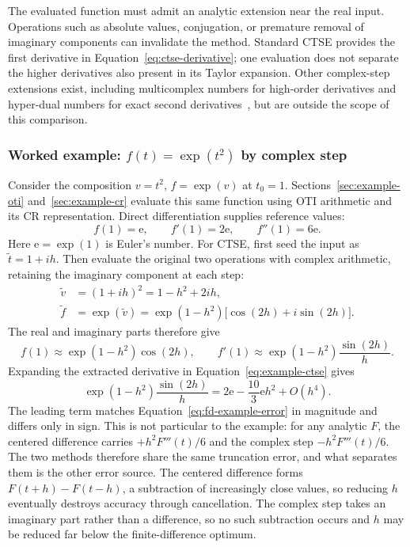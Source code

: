 \documentclass[10pt]{article}
\begin{document}
The evaluated function must admit an analytic extension near the real input.
Operations such as absolute values, conjugation, or premature removal of
imaginary components can invalidate the method. Standard CTSE provides the
first derivative in Equation~\eqref{eq:ctse-derivative}; one evaluation does not
separate the higher derivatives also present in its Taylor expansion. Other
complex-step extensions exist, including multicomplex numbers for high-order
derivatives and hyper-dual numbers for exact second
derivatives~\cite{multi_complex,multi-dual}, but are outside the scope of this
comparison.
\subsubsection{Worked example: \texorpdfstring{$f(t)=\exp(t^2)$}{f(t) = exp(t squared)} by complex step}
\label{sec:example-ctse}
Consider the composition $v=t^2$, $f=\exp(v)$ at $t_0=1$.
Sections~\ref{sec:example-oti} and~\ref{sec:example-cr} evaluate this same function
using OTI arithmetic and its CR representation. Direct differentiation supplies
reference values:
\begin{equation}
\label{eq:example-reference}
 f(1)=\mathrm e,\qquad f'(1)=2\mathrm e,\qquad f''(1)=6\mathrm e.
\end{equation}
Here $\mathrm e=\exp(1)$ is Euler's number. For CTSE, first seed the input as
$\widetilde t=1+ih$. Then evaluate the original two operations with complex
arithmetic, retaining the imaginary component at each step:
\begin{align*}
 \widetilde v&=(1+ih)^2=1-h^2+2ih,\\
 \widetilde f&=\exp(\widetilde v)
 =\exp(1-h^2)\bigl[\cos(2h)+i\sin(2h)\bigr].
\end{align*}
The real and imaginary parts therefore give
\begin{equation}
\label{eq:example-ctse}
 f(1)\approx\exp(1-h^2)\cos(2h),\qquad
 f'(1)\approx\exp(1-h^2)\frac{\sin(2h)}{h}.
\end{equation}
Expanding the extracted derivative in Equation~\eqref{eq:example-ctse} gives
\begin{equation}
\label{eq:example-ctse-error}
 \exp(1-h^2)\frac{\sin(2h)}{h}
 =2\mathrm e-\frac{10}{3}\mathrm e h^2+O(h^4).
\end{equation}
The leading term matches Equation~\eqref{eq:fd-example-error} in magnitude and
differs only in sign. This is not particular to the example: for any analytic
$F$, the centered difference carries $+h^2F'''(t)/6$ and the complex step
$-h^2F'''(t)/6$. The two methods therefore share the same truncation error, and
what separates them is the other error source. The centered difference forms
$F(t+h)-F(t-h)$, a subtraction of increasingly close values, so reducing $h$
eventually destroys accuracy through cancellation. The complex step takes an
imaginary part rather than a difference, so no such subtraction occurs and $h$
may be reduced far below the finite-difference optimum.
\end{document}
